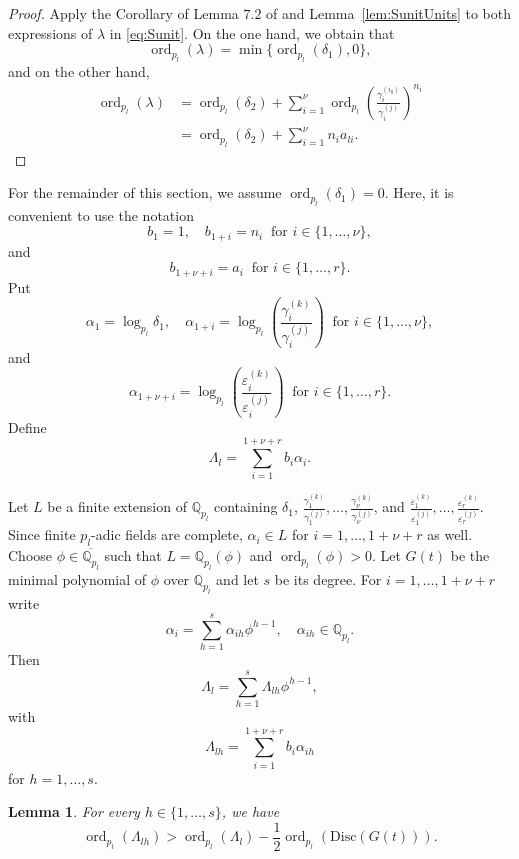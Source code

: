 \documentclass[11pt]{report}
\newtheorem{lemma}[theorem]{Lemma}
\theoremstyle{definition}
\DeclareMathOperator{\ord}{ord}
\begin{document}
\begin{proof}
Apply the Corollary of Lemma $7.2$ of \cite{TW3} and Lemma~\ref{lem:SunitUnits} to both expressions of $\lambda$ in \eqref{eq:Sunit}. On the one hand, we obtain that
\[\ord_{p_l}(\lambda) = \min\{\ord_{p_l}(\delta_1), 0\},\]
and on the other hand,
\begin{align*}
\ord_{p_l}(\lambda)
& = \ord_{p_l}(\delta_2) + \sum_{i = 1}^{\nu} \ord_{p_l}\left( \frac{\gamma_i^{(i_0)}}{\gamma_i^{(j)}}\right)^{n_i}\\
& = \ord_{p_l}(\delta_2) + \sum_{i = 1}^{\nu} n_ia_{li}.
\end{align*}
\end{proof}

For the remainder of this section, we assume $\ord_{p_l}(\delta_1) = 0$. Here, it is convenient to use the notation
\[b_1 = 1, \quad b_{1+i} = n_i \ \text{ for } i \in \{1, \dots, \nu\},\]
and
\[ b_{1+{\nu}+i} = a_i \ \text{ for } i  \in \{1, \dots, r\}.\]
Put
\[\alpha_1 = \log_{p_l} \delta_1, \quad \alpha_{1+i} = \log_{p_l}\left( \frac{\gamma_i^{(k)}}{\gamma_i^{(j)}}\right)  \ \text{ for } i \in \{1, \dots, \nu\},\]
and
\[\alpha_{1+\nu+i} = \log_{p_l}\left( \frac{\varepsilon_i^{(k)}}{\varepsilon_i^{(j)}}\right) \ \text{ for } i  \in \{1, \dots, r\}.\]
Define
\[\Lambda_l = \sum_{i = 1}^{1+\nu+r} b_i\alpha_i.\]

Let $L$ be a finite extension of $\mathbb{Q}_{p_l}$ containing $\delta_1$, $\frac{\gamma_1^{(k)}}{\gamma_1^{(j)}}, \dots, \frac{\gamma_{\nu}^{(k)}}{\gamma_{\nu}^{(j)}}$, and $\frac{\varepsilon_1^{(k)}}{\varepsilon_1^{(j)}}, \dots, \frac{\varepsilon_r^{(k)}}{\varepsilon_r^{(j)}}$. Since finite $p_l$-adic fields are complete, $\alpha_i \in L$ for $i = 1, \dots, 1+\nu+r$ as well. Choose $\phi \in \overline{\mathbb{Q}_{p_l}}$ such that $L = \mathbb{Q}_{p_l}(\phi)$ and $\ord_{p_l}(\phi) > 0 $. Let $G(t)$ be the minimal polynomial of $\phi$ over $\mathbb{Q}_{p_l}$ and let $s$ be its degree. For $i = 1, \dots, 1+\nu+r$ write
\[\alpha_i = \sum_{h = 1}^s \alpha_{ih}\phi^{h - 1}, \quad \alpha_{ih} \in \mathbb{Q}_{p_l}.\]
Then
\begin{equation} \label{eq:LambdaL}
\Lambda_l = \sum_{h = 1}^s \Lambda_{lh}\phi^{h-1},
\end{equation}
with
\[\Lambda_{lh} = \sum_{i = 1}^{1+\nu+r} b_i \alpha_{ih}\]
for $h = 1, \dots, s$.

\begin{lemma}\label{lem:DiscG}
For every $h \in \{1, \dots, s\}$, we have
\[\ord_{p_l}(\Lambda_{lh}) > \ord_{p_l}(\Lambda_l) - \frac{1}{2}\ord_{p_l}(\text{Disc}(G(t))).\]
\end{lemma}
\end{document}
